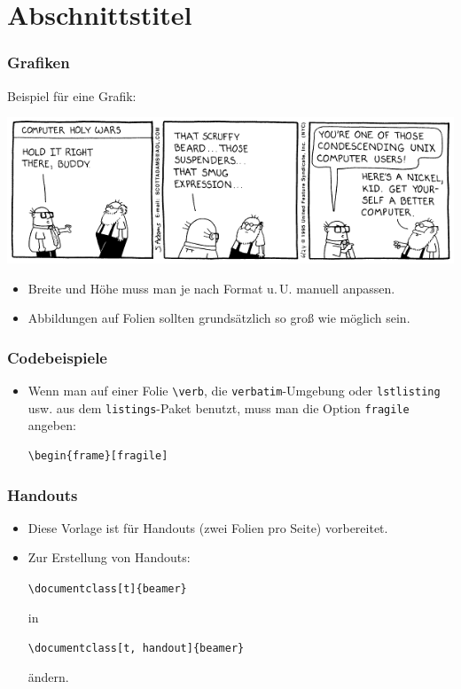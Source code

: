 \documentclass[t]{beamer} %
\begin{document}
\section{Abschnittstitel}

\begin{frame}
  \frametitle{Grafiken}

  Beispiel für eine Grafik:

  \includegraphics[width=\textwidth]{graphics/dilbert-unix}

  \begin{itemize}
  \item Breite und Höhe muss man je nach Format u.\,U. manuell
    anpassen.
  \item Abbildungen auf Folien sollten grundsätzlich so groß wie
    möglich sein.
  \end{itemize}
\end{frame}

\begin{frame}[fragile]
  \frametitle{Codebeispiele}

  \begin{itemize}
  \item Wenn man auf einer Folie \verb|\verb|, die
    \verb|verbatim|-Umgebung oder \verb|lstlisting| usw. aus dem
    \texttt{listings}-Paket benutzt, \alert{muss} man die Option
    \verb|fragile| angeben:

\begin{verbatim}
\begin{frame}[fragile]
\end{verbatim}
  \end{itemize}
\end{frame}

\begin{frame}[fragile]
  \frametitle{Handouts}

  \begin{itemize}
  \item Diese Vorlage ist für Handouts (zwei Folien pro Seite)
    vorbereitet.
  \item Zur Erstellung von Handouts:

    \verb|\documentclass[t]{beamer}|

    in

    \verb|\documentclass[t, handout]{beamer}|

    ändern.
  \end{itemize}
\end{frame}
\end{document}
